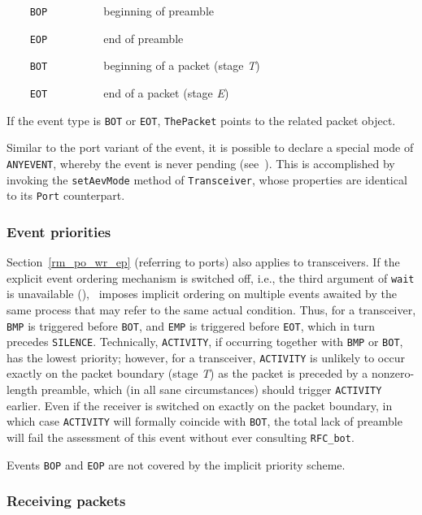 \bigskip

\noindent
{\tt ~~~~BOP~~~~~~~~~} beginning of preamble

\noindent
{\tt ~~~~EOP~~~~~~~~~} end of preamble

\noindent
{\tt ~~~~BOT~~~~~~~~~} beginning of a packet (stage {\em T\/})

\noindent
{\tt ~~~~EOT~~~~~~~~~} end of a packet (stage {\em E\/})

\bigskip

If the event type is {\tt BOT} or {\tt EOT},
{\tt ThePacket} points to the related packet object.

Similar to the port variant of the event, it is possible to
declare a special mode of {\tt ANYEVENT}, whereby the event is never pending
(see~).
This is accomplished by invoking the {\tt setAevMode} method of
{\tt Transceiver}, whose properties are identical to its {\tt Port}
counterpart.

\subsubsection{Event priorities}
\label{rm_tr_pp_ep}

Section~\ref{rm_po_wr_ep} (referring to ports) also applies to
transceivers.
If the explicit event ordering mechanism is switched off, i.e.,
the third argument of {\tt wait} is unavailable (),
\smurph\ imposes implicit ordering on multiple events awaited by the
same process that may refer to the same actual condition.
Thus, for a transceiver,
{\tt BMP} is triggered before {\tt BOT}, and {\tt EMP} is triggered
before {\tt EOT}, which in turn precedes {\tt SILENCE}.
Technically, {\tt ACTIVITY}, if occurring together with {\tt BMP} or
{\tt BOT}, has the lowest priority; however, for a transceiver, 
{\tt ACTIVITY} is unlikely to occur exactly on the packet boundary
(stage {\em T\/}) as the packet is preceded by a nonzero-length preamble,
which (in all sane circumstances) should trigger {\tt ACTIVITY} earlier.
Even if the receiver is switched on exactly on the packet boundary, in
which case {\tt ACTIVITY} will formally coincide with {\tt BOT},
the total lack of preamble will fail the assessment of this event
without ever consulting {\tt RFC\_bot}.

Events {\tt BOP} and {\tt EOP} are not covered by the implicit
priority scheme.

\subsubsection{Receiving packets}
\label{rm_tr_pp_rp}

